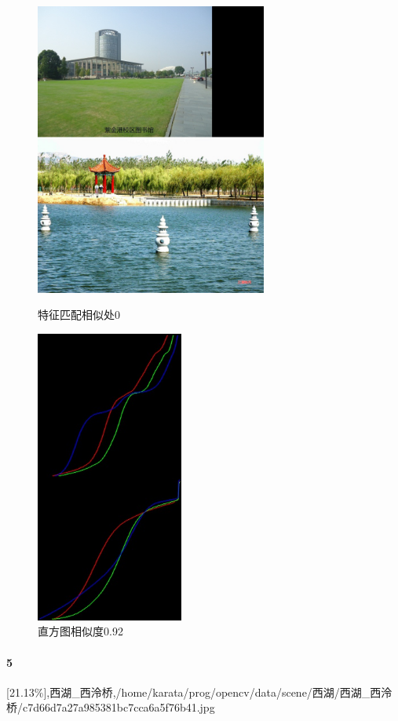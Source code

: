\begin{figure}[htb]
\begin{minipage}[t]{0.5\linewidth}
\centering
\includegraphics[height=3.8in]{紫金港图书馆.jpg.d/im4sift.jpg}
\caption{特征匹配相似处0}
\label{fig:side:a}
\end{minipage}%
\begin{minipage}[t]{0.5\linewidth}
\centering
\includegraphics[height=3.8in]{紫金港图书馆.jpg.d/im4hist2.jpg}
\caption{直方图相似度0.92}
\label{fig:side:a}
\end{minipage}%
\end{figure}

\paragraph{5}
[21.13\%],西湖_西泠桥,/home/karata/prog/opencv/data/scene/西湖/西湖_西泠桥/c7d66d7a27a985381bc7cca6a5f76b41.jpg

